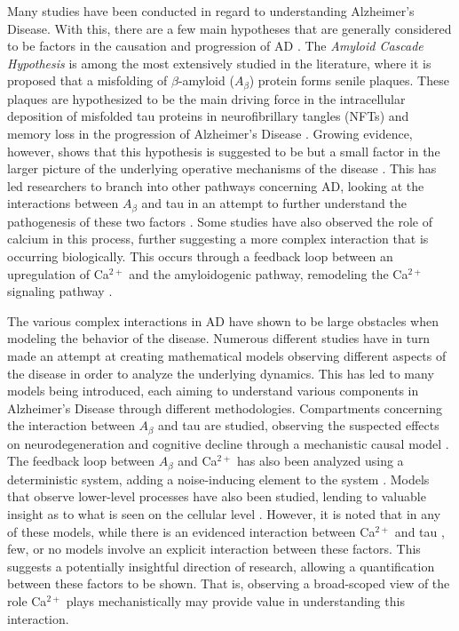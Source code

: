 \documentclass[12pt]{article}
\theoremstyle{definition}
\begin{document}
Many studies have been conducted in regard to understanding Alzheimer's Disease. With this, there are a few main hypotheses that are generally considered to be factors in the causation and progression of AD \cite{zhang2024recent}. The \textit{Amyloid Cascade Hypothesis} is among the most extensively studied in the literature, where it is proposed that a misfolding of $\beta$-amyloid ($A_\beta$) protein forms senile plaques. These plaques are hypothesized to be the main driving force in the intracellular deposition of misfolded tau proteins in neurofibrillary tangles (NFTs) and memory loss in the progression of Alzheimer's Disease \cite{hardy1992alzheimer}. Growing evidence, however, shows that this hypothesis is suggested to be but a small factor in the larger picture of the underlying operative mechanisms of the disease \cite{kepp2023amyloid}. This has led researchers to branch into other pathways concerning AD, looking at the interactions between $A_\beta$ and tau in an attempt to further understand the pathogenesis of these two factors \cite{zhang2021interaction}. Some studies have also observed the role of calcium in this process, further suggesting a more complex interaction that is occurring biologically. This occurs through a feedback loop between an upregulation of Ca$^{2+}$ and the amyloidogenic pathway, remodeling the Ca$^{2+}$ signaling pathway \cite{berridge2010calcium}.

The various complex interactions in AD have shown to be large obstacles when modeling the behavior of the disease. Numerous different studies have in turn made an attempt at creating mathematical models observing different aspects of the disease in order to analyze the underlying dynamics. This has led to many models being introduced, each aiming to understand various components in Alzheimer's Disease through different methodologies. Compartments concerning the interaction between $A_\beta$ and tau are studied, observing the suspected effects on neurodegeneration and cognitive decline through a mechanistic causal model \cite{hao2022optimal, petrella2019computational}. The feedback loop between $A_\beta$ and Ca$^{2+}$ has also been analyzed using a deterministic system, adding a noise-inducing element to the system \cite{pal2025nonequilibrium,zhang2020mathematical}. Models that observe lower-level processes have also been studied, lending to valuable insight as to what is seen on the cellular level \cite{lang2023stationary, maji2026quantifying}. However, it is noted that in any of these models, while there is an evidenced interaction between Ca$^{2+}$ and tau \cite{rapaka2014calcium}, few, or no models involve an explicit interaction between these factors. This suggests a potentially insightful direction of research, allowing a quantification between these factors to be shown. That is, observing a broad-scoped view of the role Ca$^{2+}$ plays mechanistically may provide value in understanding this interaction.
\end{document}
